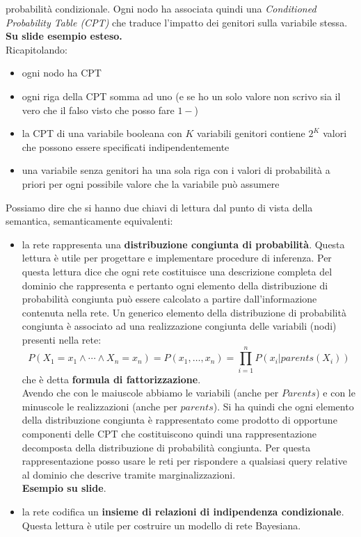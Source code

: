 \message{ !name(modprob.tex)}\documentclass[a4paper,12pt, oneside]{book}
\begin{document}
probabilità condizionale. Ogni nodo ha associata quindi una \textit{Conditioned
  Probability Table (\textit{CPT})} che traduce l'impatto dei genitori sulla
variabile stessa.\\
\textbf{Su slide esempio esteso.}\\
Ricapitolando:
\begin{itemize}
  \item ogni nodo ha CPT
  \item ogni riga della CPT somma ad uno (e se ho un solo valore non scrivo sia
  il vero che il falso visto che posso fare $1-$)
  \item la CPT di una variabile booleana con $K$ variabili genitori contiene
  $2^K$ valori che possono essere specificati indipendentemente
  \item una variabile senza genitori ha una sola riga con i valori di
  probabilità a priori per ogni possibile valore che la variabile può assumere 
\end{itemize}
Possiamo dire che si hanno due chiavi di lettura dal punto di vista della
semantica, semanticamente equivalenti: 
\begin{itemize}
  \item la rete rappresenta una \textbf{distribuzione congiunta di
    probabilità}. Questa 
  lettura è utile per progettare e implementare procedure di inferenza. Per
  questa lettura dice che ogni rete costituisce una descrizione completa del
  dominio che rappresenta e pertanto ogni elemento della distribuzione di
  probabilità congiunta può essere calcolato a partire dall’informazione
  contenuta nella rete. Un generico elemento della distribuzione di probabilità
  congiunta è associato ad una realizzazione congiunta delle variabili (nodi)
  presenti nella rete:
  \[P(X_1=x_1\land\cdots\land X_n=x_n)=P(x_1,\ldots
    ,x_n)=\prod_{i=1}^nP(x_i|parents(X_i))\]
  che è detta \textbf{formula di fattorizzazione}.\\
  Avendo che con le maiuscole abbiamo le variabili (anche per $Parents$) e con
  le minuscole le realizzazioni (anche per $parents$). Si ha quindi che ogni
  elemento della distribuzione congiunta è rappresentato come prodotto di
  opportune componenti delle CPT che costituiscono quindi una rappresentazione
  decomposta della distribuzione di probabilità congiunta. Per questa
  rappresentazione posso usare le reti per rispondere a qualsiasi query relative
  al dominio che descrive tramite marginalizzazioni.\\
  \textbf{Esempio su slide}.
  
  \item la rete codifica un \textbf{insieme di relazioni di indipendenza
    condizionale}. Questa lettura è utile per costruire un modello di rete
  Bayesiana.
\end{itemize}
\end{document}
